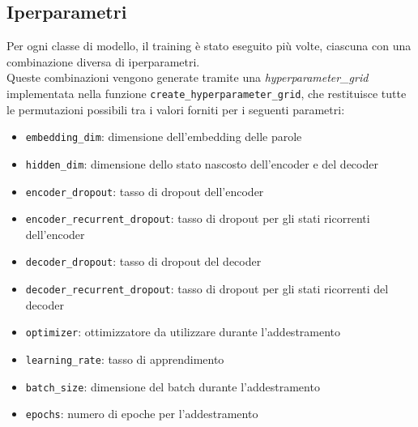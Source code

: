 \subsection{Iperparametri}
Per ogni classe di modello, il training è stato eseguito più volte, ciascuna con una combinazione diversa di iperparametri.\\
Queste combinazioni vengono generate tramite una \textit{hyperparameter\_grid}
implementata nella funzione \texttt{create\_hyperparameter\_grid}, che restituisce tutte le
permutazioni possibili tra i valori forniti per i seguenti parametri:
\begin{itemize}
    \item \texttt{embedding\_dim}: dimensione dell'embedding delle parole
    \item \texttt{hidden\_dim}: dimensione dello stato nascosto dell'encoder e del decoder
    \item \texttt{encoder\_dropout}: tasso di dropout dell'encoder
    \item \texttt{encoder\_recurrent\_dropout}: tasso di dropout per gli stati ricorrenti dell'encoder
    \item \texttt{decoder\_dropout}: tasso di dropout del decoder
    \item \texttt{decoder\_recurrent\_dropout}: tasso di dropout per gli stati ricorrenti del decoder
    \item \texttt{optimizer}: ottimizzatore da utilizzare durante l'addestramento
    \item \texttt{learning\_rate}: tasso di apprendimento
    \item \texttt{batch\_size}: dimensione del batch durante l'addestramento
    \item \texttt{epochs}: numero di epoche per l'addestramento
\end{itemize}

